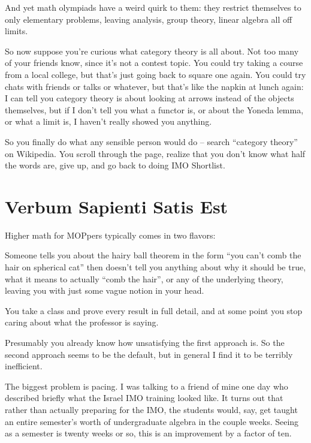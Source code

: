 And yet math olympiads have a weird quirk to them: they restrict themselves to only elementary problems, leaving analysis, group theory, linear algebra all off limits.

So now suppose you're curious what category theory is all about.
Not too many of your friends know, since it's not a contest topic.
You could try taking a course from a local college, but that's just going back to square one again.
You could try chats with friends or talks or whatever, but that's like the napkin at lunch again:
I can tell you category theory is about looking at arrows instead of the objects themselves,
but if I don't tell you what a functor is, or about the Yoneda lemma,
or what a limit is, I haven't really showed you anything.

So you finally do what any sensible person would do -- search ``category theory'' on Wikipedia.
You scroll through the page, realize that you don't know what half the words are, give up, and go back to doing IMO Shortlist.




\section*{Verbum Sapienti Satis Est}
Higher math for MOPpers typically comes in two flavors:
\begin{itemize}
	\ii Someone tells you about the hairy ball theorem in the form ``you can't comb the hair on spherical cat''
	then doesn't tell you anything about why it should be true, what it means to actually ``comb the hair'', 
	or any of the underlying theory, leaving you with just some vague notion in your head.

	\ii You take a class and prove every result in full detail, and at some point
	you stop caring about what the professor is saying.
\end{itemize}
Presumably you already know how unsatisfying the first approach is.
So the second approach seems to be the default,
but in general I find it to be terribly inefficient.

The biggest problem is pacing.
I was talking to a friend of mine one day who described briefly
what the Israel IMO training looked like.
It turns out that rather than actually preparing for the IMO,
the students would, say, get taught an entire semester's worth of
undergraduate algebra in the couple weeks.
Seeing as a semester is twenty weeks or so, this is an improvement
by a factor of ten.

